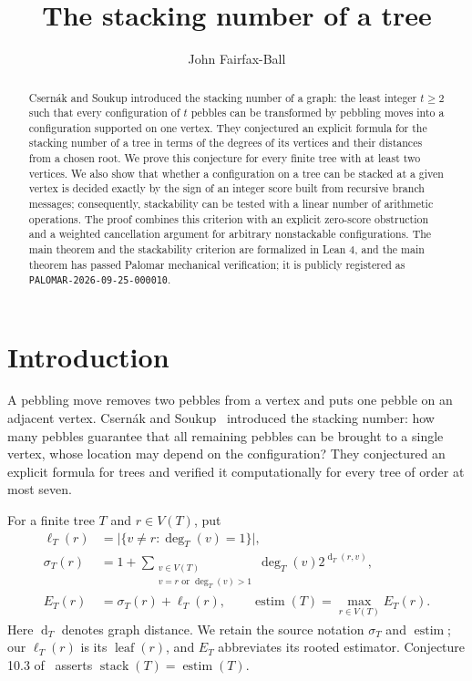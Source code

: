 \documentclass[11pt]{amsart}
\title{The stacking number of a tree}
\author{John Fairfax-Ball}
\date{}
\theoremstyle{definition}
\theoremstyle{remark}
\DeclareMathOperator{\stack}{stack}
\DeclareMathOperator{\estim}{estim}
\DeclareMathOperator{\dist}{d}
\begin{document}
\begin{abstract}
Csern\'ak and Soukup introduced the stacking number of a graph: the least
integer $t\ge2$ such that every configuration of $t$ pebbles can be
transformed by pebbling moves into a configuration supported on one vertex.
They conjectured an explicit formula for the stacking number of a tree in
terms of the degrees of its vertices and their distances from a chosen root.
We prove this conjecture for every finite tree with at least two vertices.
We also show that whether a configuration on a tree can be stacked at a given
vertex is decided exactly by the sign of an integer score built from
recursive branch messages; consequently, stackability can be tested with a
linear number of arithmetic operations. The proof combines this criterion
with an explicit zero-score obstruction and a weighted cancellation argument
for arbitrary nonstackable configurations. The main theorem and the
stackability criterion are formalized in Lean 4, and the main theorem has
passed Palomar mechanical verification; it is publicly registered as
\texttt{PALOMAR-2026-09-25-000010}.
\end{abstract}
\maketitle

\section{Introduction}
A pebbling move removes two pebbles from a vertex and puts one pebble on an
adjacent vertex. Csern\'ak and Soukup~\cite{cs2026} introduced the stacking
number: how many pebbles guarantee that all remaining pebbles can be brought
to a single vertex, whose location may depend on the configuration? They
conjectured an explicit formula for trees and verified it computationally
for every tree of order at most seven.

For a finite tree $T$ and $r\in V(T)$, put
\begin{align}
 \ell_T(r)&=\bigl|\{v\ne r:\deg_T(v)=1\}\bigr|,\label{eq:leaves}\\
 \sigma_T(r)&=1+\sum_{\substack{v\in V(T)\\v=r\text{ or }\deg_T(v)>1}}
                 \deg_T(v)2^{\dist_T(r,v)},\label{eq:sigma}\\
 E_T(r)&=\sigma_T(r)+\ell_T(r),\qquad
 \estim(T)=\max_{r\in V(T)}E_T(r).\label{eq:estimator}
\end{align}
Here $\dist_T$ denotes graph distance. We retain the source notation
$\sigma_T$ and $\estim$; our $\ell_T(r)$ is its $\operatorname{leaf}(r)$,
and $E_T$ abbreviates its rooted estimator.
Conjecture 10.3 of~\cite{cs2026} asserts $\stack(T)=\estim(T)$.
\end{document}
